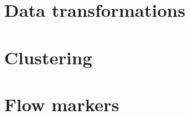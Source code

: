 \documentclass[12pt,a4paper,table,twoside]{report}
\begin{document}
\chapter{\label{appendix:transformation}Data transformations}


\chapter{\label{appendix:clustering}Clustering}


\chapter{\label{appendix:flowsorting}{Flow markers}}


%


%

\singlespacing
\footnotesize

\printglossary[type=\acronymtype]

\newpage


%


\end{document}
